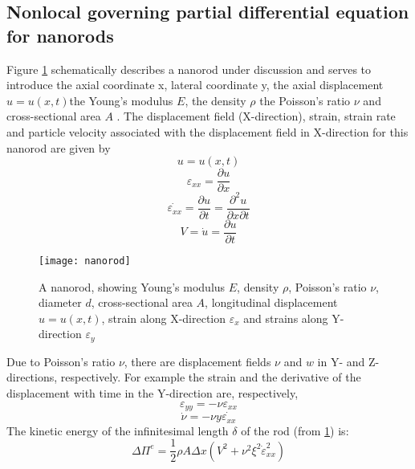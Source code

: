 \subsection{Nonlocal governing partial differential equation for nanorods}
Figure \ref{nanorod} schematically describes a nanorod under discussion and
serves to introduce the axial coordinate x, lateral coordinate y, the
axial displacement $u = u(x,t)$the Young’s modulus $E$, the density $\rho$ the Poisson’s ratio $\nu$ and cross-sectional area $A$ . The displacement
field (X-direction), strain, strain rate and particle velocity associated with the displacement field in X-direction for this nanorod
are given by\\
\begin{equation}
u=u(x,t)
\end{equation}
\begin{equation}
\varepsilon_{xx}=\frac{\partial u}{\partial x}
\end{equation}
\begin{equation}
\dot{\varepsilon_{xx}}=\frac{\partial u}{\partial t} = \frac{\partial^2 u}{\partial x \partial t}
\end{equation}
\begin{equation}
V = \dot{u} = \frac{\partial u}{\partial t}
\end{equation}
\begin{figure}[b]
\centering
\texttt{[image: nanorod]}
\caption{A nanorod, showing Young’s modulus $E$, density $\rho$, Poisson’s ratio $\nu$, diameter $d$, cross-sectional area $A$, longitudinal displacement $u=u(x,t)$, strain along X-direction $\varepsilon_x$ and strains along Y-direction $\varepsilon_y$}
\label{nanorod}
\end{figure}
Due to Poisson’s ratio $\nu$, there are displacement fields $\nu$ and $w$ in
Y- and Z-directions, respectively. For example the strain and the
derivative of the displacement with time in the Y-direction are,
respectively,\\
\begin{equation}
\varepsilon_{yy}=-\nu \varepsilon_{xx}
\end{equation}
\begin{equation}
\dot{\nu}=-\nu y\dot{\varepsilon_{xx}}
\end{equation}
The kinetic energy of the infinitesimal length $\delta$ of the rod (from \ref{nanorod}) is:\\
\begin{equation}
\Delta \Pi^e = \frac{1}{2} \rho A \Delta x (V^2+\nu^2 \xi^2 \dot{\varepsilon}^2_{xx})
\end{equation}
